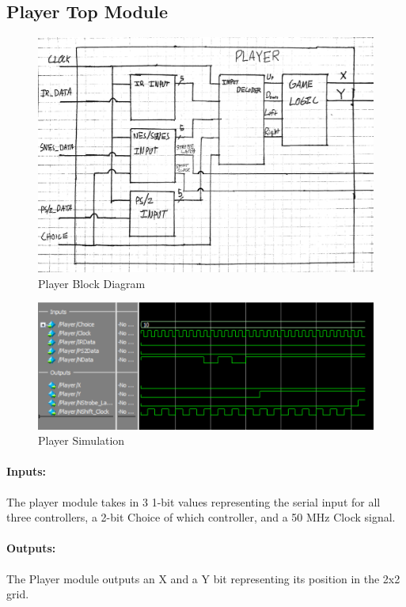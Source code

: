 \documentclass[]{article}
\begin{document}
\subsection{Player Top Module}
\begin{figure}[H]\centering
    \includegraphics[width=\linewidth]{figures/Player_Block.jpg}
    \caption{Player Block Diagram}
    \label{fig:playerBlock}
\end{figure}
\begin{figure}[H]\centering
    \includegraphics[width=\linewidth]{figures/Player_Sim.png}
    \caption{Player Simulation}
    \label{fig:playerSim}
\end{figure}
\paragraph{Inputs:} The player module takes in 3 1-bit values representing the serial input for all three controllers, a 2-bit Choice of which controller, and a 50 MHz Clock signal.
\paragraph{Outputs:} The Player module outputs an X and a Y bit representing its position in the 2x2 grid.
\end{document}
